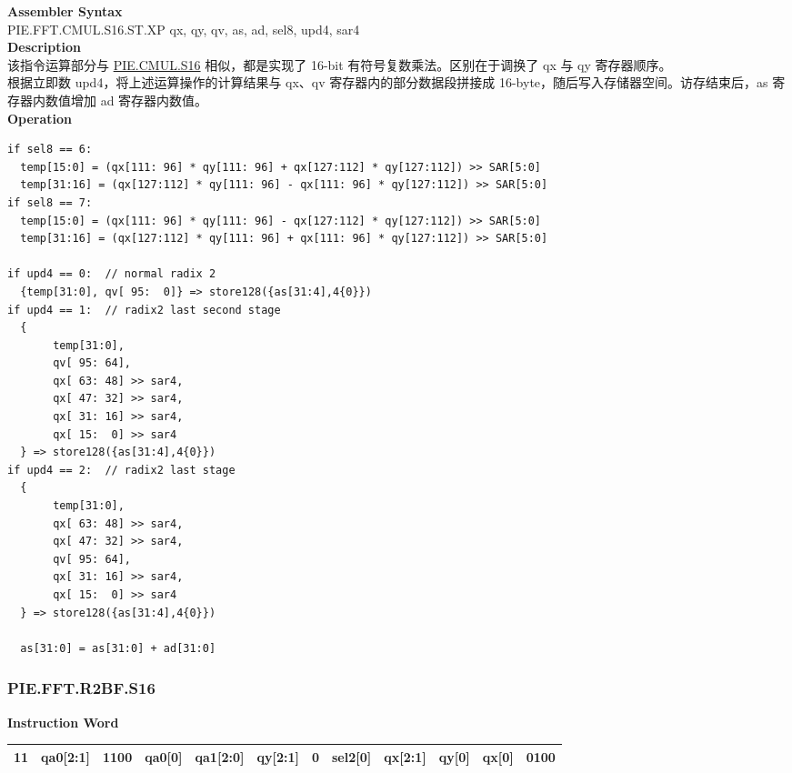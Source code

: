 \textbf{Assembler Syntax} \\
PIE.FFT.CMUL.S16.ST.XP qx, qy, qv, as, ad, sel8, upd4, sar4 \\
\textbf{Description} \\
该指令运算部分与 \hyperref[instruction:PIECMULS16]{PIE.CMUL.S16} 相似，都是实现了 16-bit 有符号复数乘法。区别在于调换了 qx 与 qy 寄存器顺序。\\
根据立即数 upd4，将上述运算操作的计算结果与 qx、qv 寄存器内的部分数据段拼接成 16-byte，随后写入存储器空间。访存结束后，as 寄存器内数值增加 ad 寄存器内数值。\\
\textbf{Operation}
\begin{lstlisting}
if sel8 == 6:
  temp[15:0] = (qx[111: 96] * qy[111: 96] + qx[127:112] * qy[127:112]) >> SAR[5:0]
  temp[31:16] = (qx[127:112] * qy[111: 96] - qx[111: 96] * qy[127:112]) >> SAR[5:0]
if sel8 == 7:
  temp[15:0] = (qx[111: 96] * qy[111: 96] - qx[127:112] * qy[127:112]) >> SAR[5:0]
  temp[31:16] = (qx[127:112] * qy[111: 96] + qx[111: 96] * qy[127:112]) >> SAR[5:0]

if upd4 == 0:  // normal radix 2
  {temp[31:0], qv[ 95:  0]} => store128({as[31:4],4{0}})
if upd4 == 1:  // radix2 last second stage
  {
       temp[31:0],
       qv[ 95: 64],
       qx[ 63: 48] >> sar4,
       qx[ 47: 32] >> sar4,
       qx[ 31: 16] >> sar4,
       qx[ 15:  0] >> sar4
  } => store128({as[31:4],4{0}})
if upd4 == 2:  // radix2 last stage
  {
       temp[31:0],
       qx[ 63: 48] >> sar4,
       qx[ 47: 32] >> sar4,
       qv[ 95: 64],
       qx[ 31: 16] >> sar4,
       qx[ 15:  0] >> sar4
  } => store128({as[31:4],4{0}})

  as[31:0] = as[31:0] + ad[31:0]
\end{lstlisting}



\newpage
\subsubsection{PIE.FFT.R2BF.S16}\label{instruction:PIEFFTR2BFS16}
\setlength\tabcolsep{6pt}
\textbf{Instruction Word} \\
\begin{tabular}{|c|c|c|c|c|c|c|c|c|c|c|c|}
	\hline
	11 & qa0[2:1] & 1100 & qa0[0] & qa1[2:0] & qy[2:1] & 0 & sel2[0] & qx[2:1] & qy[0] & qx[0] & 0100 \\
	\hline
\end{tabular}

